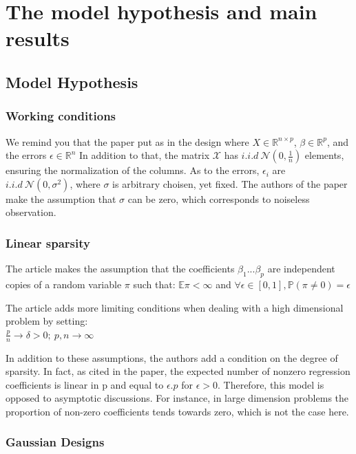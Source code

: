 \documentclass[10pt,onecolumn,letterpaper]{article}
\begin{document}
\section{The model hypothesis and main results}

\subsection{Model Hypothesis }

\subsubsection{Working conditions}

We remind you that the paper put as in the design where $X \in \mathbb{R}^{n \times p}$, $ \beta \in \mathbb{R}^p$, and the errors $\epsilon \in \mathbb{R}^n$ 
In addition to that, the matrix \textbf{$\mathcal{X}$} has $i.i.d~\mathcal{N}(0,\frac{1}{n})$ elements, ensuring the normalization of the columns. As to the errors, $\epsilon_i$ are $i.i.d~\mathcal{N}(0,\sigma^2)$, where $\sigma$ is arbitrary choisen, yet fixed. The authors of the paper make the assumption that $\sigma$ can be zero, which corresponds to noiseless observation.


\subsubsection{Linear sparsity}
The article makes the assumption that the coefficients $\beta_1 ... \beta_p $ are independent copies of a random variable $\pi$ such that: $\mathbb{E}\pi < \infty $ and $\forall \epsilon \in \left[0,1\right], \mathbb{P}(\pi \neq 0) = \epsilon$

The article adds more limiting conditions when dealing with a high dimensional problem by setting:\\
 $\frac{p}{n} \to  \delta > 0; ~ p,n \to \infty$

In addition to these assumptions, the authors add a condition on the degree of sparsity. In fact, as cited in the paper, the expected number of nonzero regression coefficients is linear in p and equal to $\epsilon.p$ for $\epsilon > 0$. Therefore, this model is opposed to asymptotic discussions. For instance, in large dimension problems the proportion of non-zero coefficients tends towards zero, which is not the case here.

\subsubsection{Gaussian Designs}
\end{document}
